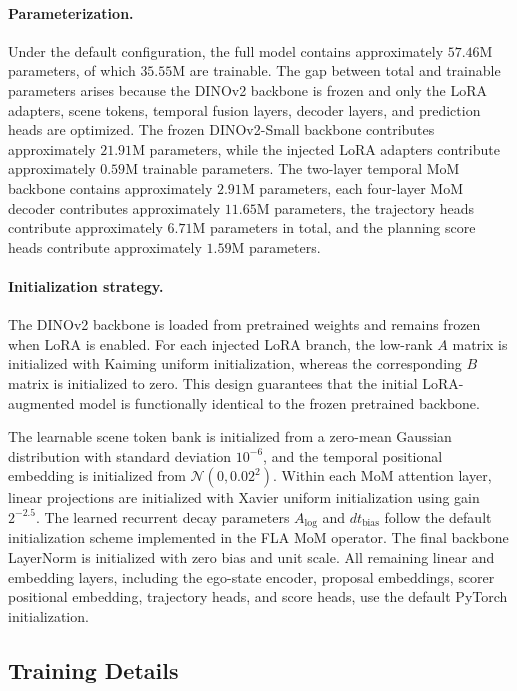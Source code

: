 \paragraph{Parameterization.}
Under the default configuration, the full model contains approximately $57.46$M parameters, of which $35.55$M are trainable. The gap between total and trainable parameters arises because the DINOv2 backbone is frozen and only the LoRA adapters, scene tokens, temporal fusion layers, decoder layers, and prediction heads are optimized. The frozen DINOv2-Small backbone contributes approximately $21.91$M parameters, while the injected LoRA adapters contribute approximately $0.59$M trainable parameters. The two-layer temporal MoM backbone contains approximately $2.91$M parameters, each four-layer MoM decoder contributes approximately $11.65$M parameters, the trajectory heads contribute approximately $6.71$M parameters in total, and the planning score heads contribute approximately $1.59$M parameters.

\paragraph{Initialization strategy.}
The DINOv2 backbone is loaded from pretrained weights and remains frozen when LoRA is enabled. For each injected LoRA branch, the low-rank $A$ matrix is initialized with Kaiming uniform initialization, whereas the corresponding $B$ matrix is initialized to zero. This design guarantees that the initial LoRA-augmented model is functionally identical to the frozen pretrained backbone.

The learnable scene token bank is initialized from a zero-mean Gaussian distribution with standard deviation $10^{-6}$, and the temporal positional embedding is initialized from $\mathcal{N}(0, 0.02^2)$. Within each MoM attention layer, linear projections are initialized with Xavier uniform initialization using gain $2^{-2.5}$. The learned recurrent decay parameters $A_{\log}$ and $dt_{\mathrm{bias}}$ follow the default initialization scheme implemented in the FLA MoM operator. The final backbone LayerNorm is initialized with zero bias and unit scale. All remaining linear and embedding layers, including the ego-state encoder, proposal embeddings, scorer positional embedding, trajectory heads, and score heads, use the default PyTorch initialization.

\subsection{Training Details}

